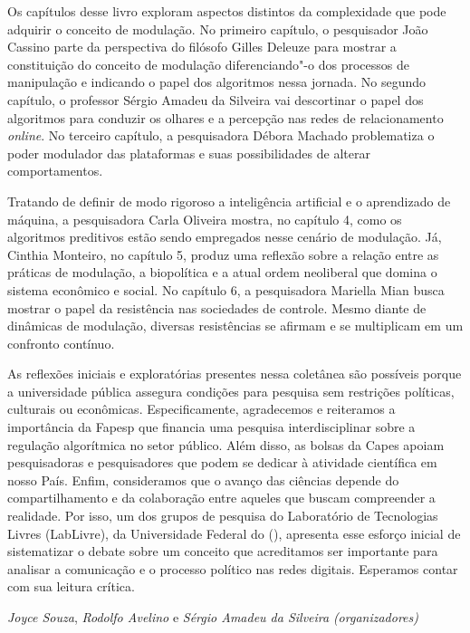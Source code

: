 Os capítulos desse livro exploram aspectos distintos da complexidade que
pode adquirir o conceito de modulação. No primeiro capítulo, o
pesquisador João Cassino parte da perspectiva do filósofo Gilles Deleuze
para mostrar a constituição do conceito de modulação diferenciando"-o dos
processos de manipulação e indicando o papel dos algoritmos nessa
jornada. No segundo capítulo, o professor Sérgio Amadeu da Silveira vai
descortinar o papel dos algoritmos para conduzir os olhares e a
percepção nas redes de relacionamento \emph{online}. No terceiro
capítulo, a pesquisadora Débora Machado problematiza o poder modulador
das plataformas e suas possibilidades de alterar comportamentos.

Tratando de definir de modo rigoroso a inteligência artificial e o
aprendizado de máquina, a pesquisadora Carla Oliveira mostra, no
capítulo 4, como os algoritmos preditivos estão sendo empregados nesse
cenário de modulação. Já, Cinthia Monteiro, no capítulo 5, produz uma
reflexão sobre a relação entre as práticas de modulação, a biopolítica e
a atual ordem neoliberal que domina o sistema econômico e social. No
capítulo 6, a pesquisadora Mariella Mian busca mostrar o papel da
resistência nas sociedades de controle. Mesmo diante de dinâmicas de
modulação, diversas resistências se afirmam e se multiplicam em um
confronto contínuo.

As reflexões iniciais e exploratórias presentes nessa coletânea são
possíveis porque a universidade pública assegura condições para pesquisa
sem restrições políticas, culturais ou econômicas. Especificamente,
agradecemos e reiteramos a importância da Fapesp que financia uma
pesquisa interdisciplinar sobre a regulação algorítmica no setor
público. Além disso, as bolsas da Capes apoiam pesquisadoras e
pesquisadores que podem se dedicar à atividade científica em nosso País.
Enfim, consideramos que o avanço das ciências depende do
compartilhamento e da colaboração entre aqueles que buscam
compreender a realidade. Por isso, um dos grupos de pesquisa do
Laboratório de Tecnologias Livres (LabLivre), da Universidade Federal do 
(), apresenta esse esforço inicial de sistematizar o debate sobre um
conceito que acreditamos ser importante para analisar a comunicação e o
processo político nas redes digitais. Esperamos contar com sua leitura
crítica.

\begin{flushright}
\small{
\emph{Joyce Souza}, \emph{Rodolfo Avelino} e \emph{Sérgio Amadeu da Silveira} \emph{(organizadores)}}
\end{flushright}